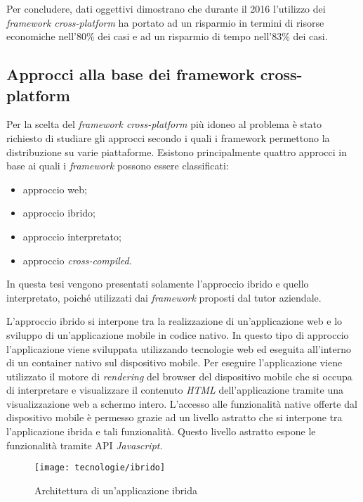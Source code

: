 Per concludere, dati oggettivi dimostrano che durante il 2016 l'utilizzo dei \textit{framework cross-platform} ha portato ad un risparmio in termini di risorse economiche nell'80\% dei casi e ad un risparmio di tempo nell'83\% dei casi.

\subsection{Approcci alla base dei framework cross-platform}

Per la scelta del \textit{framework cross-platform} più idoneo al problema è stato richiesto di studiare gli approcci secondo i quali i framework permettono la distribuzione su varie piattaforme. Esistono principalmente quattro approcci in base ai quali i \textit{framework} possono essere classificati:
\begin{itemize}
	\item approccio web;
	\item approccio ibrido;
	\item approccio interpretato;
	\item approccio \textit{cross-compiled}.
\end{itemize}

In questa tesi vengono presentati solamente l'approccio ibrido e quello interpretato, poiché utilizzati dai \textit{framework} proposti dal tutor aziendale.

L'approccio ibrido si interpone tra la realizzazione di un'applicazione web e lo sviluppo di un'applicazione mobile in codice nativo. In questo tipo di approccio l'applicazione viene sviluppata utilizzando tecnologie web ed eseguita all'interno di un container nativo sul dispositivo mobile. Per eseguire l'applicazione viene utilizzato il motore di \textit{rendering} del browser del dispositivo mobile che si occupa di interpretare e visualizzare il contenuto \textit{HTML} dell'applicazione tramite una visualizzazione web a schermo intero. L'accesso alle funzionalità native offerte dal dispositivo mobile è permesso grazie ad un livello astratto che si interpone tra l'applicazione ibrida e tali funzionalità. Questo livello astratto espone le funzionalità tramite API \textit{Javascript}. 

\begin{figure}[!h] 
    \centering 
    \texttt{[image: tecnologie/ibrido]} 
    \caption{Architettura di un'applicazione ibrida}
\end{figure}

